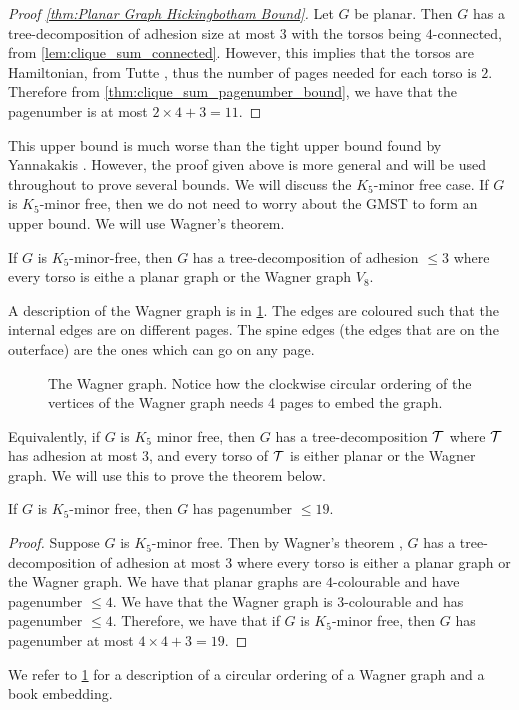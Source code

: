 \begin{proof}[Proof \cref{thm:Planar Graph Hickingbotham Bound}]
	Let \(G\) be planar. Then \(G\) has a tree-decomposition of adhesion size at most \(3\) with the torsos being \(4\)-connected, from \cref{lem:clique_sum_connected}. However, this implies that the torsos are Hamiltonian, from Tutte \cite{tutteTheoremPlanarGraphs1956}, thus the number of pages needed for each torso is \(2\). Therefore from \cref{thm:clique_sum_pagenumber_bound}, we have that the pagenumber is at most \(2 \times 4 + 3 = 11\). 
\end{proof}
This upper bound is much worse than the tight upper bound found by Yannakakis \cite{yannakakisEmbeddingPlanarGraphs1989}. However, the proof given above is more general and will be used throughout to prove several bounds. 
We will discuss the \(K_5\)-minor free case. If \(G\) is \(K_5\)-minor free, then we do not need to worry about the GMST to form an upper bound. We will use Wagner's theorem.
\begin{theorem}\label{thm:WagnersTheorem}
	If \(G\) is \(K_5\)-minor-free, then \(G\) has a tree-decomposition of adhesion $\leq 3$ where every torso is eithe a planar graph or the Wagner graph \(V_8\).
\end{theorem}
A description of the Wagner graph is in \cref{fig:wagner}. The edges are coloured such that the internal edges are on different pages. The spine edges (the edges that are on the outerface) are the ones which can go on any page. 
\begin{figure}[h]
	\centering
	\begin{tikzpicture}
		
	\end{tikzpicture}
	\caption{The Wagner graph. Notice how the clockwise circular ordering of the vertices of the Wagner graph needs 4 pages to embed the graph. }\label{fig:wagner}
\end{figure}
Equivalently, if \(G\) is \(K_5\) minor free, then \(G\) has a tree-decomposition \(\tree\) where \(\tree\) has adhesion at most 3, and every torso of \(\tree\) is either planar or the Wagner graph. We will use this to prove the theorem below. 
\begin{theorem}
	If \(G\) is \(K_5\)-minor free, then \(G\) has pagenumber \(\leq 19\).
\end{theorem}

\begin{proof}
	Suppose \(G\) is \(K_5\)-minor free. Then by Wagner's theorem \cite{wagnerUeberEigenschaftEbenen1937}, \(G\) has a tree-decomposition of adhesion at most 3 where every torso is either a planar graph or the Wagner graph.
	We have that planar graphs are \(4\)-colourable and have pagenumber \(\leq 4\). We have that the Wagner graph is \(3\)-colourable and has pagenumber \(\leq 4\). Therefore, we have that if \(G\) is \(K_5\)-minor free, then \(G\) has pagenumber at most \(4 \times 4 + 3 = 19\). 
\end{proof}
We refer to \cref{fig:wagner} for a description of a circular ordering of a Wagner graph and a book embedding. 
